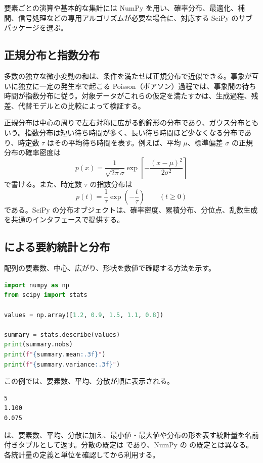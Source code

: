 要素ごとの演算や基本的な集計には NumPy を用い、確率分布、最適化、補間、信号処理などの専用アルゴリズムが必要な場合に、対応する SciPy のサブパッケージを選ぶ。

\subsection{正規分布と指数分布}

多数の独立な微小変動の和は、条件を満たせば正規分布で近似できる。事象が互いに独立に一定の発生率で起こる Poisson（ポアソン）過程では、事象間の待ち時間が指数分布に従う。対象データがこれらの仮定を満たすかは、生成過程、残差、代替モデルとの比較によって検証する。

正規分布は中心の周りで左右対称に広がる釣鐘形の分布であり、ガウス分布ともいう。指数分布は短い待ち時間が多く、長い待ち時間ほど少なくなる分布であり、時定数 \(\tau\) はその平均待ち時間を表す。例えば、平均 \(\mu\)、標準偏差 \(\sigma\) の正規分布の確率密度は
\[
p(x) = \frac{1}{\sqrt{2\pi}\sigma}
\exp\!\left[-\frac{(x-\mu)^2}{2\sigma^2}\right]
\]
で書ける。また、時定数 \(\tau\) の指数分布は
\[
p(t) = \frac{1}{\tau} \exp\!\left(-\frac{t}{\tau}\right)
\qquad (t \ge 0)
\]
である。SciPy の分布オブジェクトは、確率密度、累積分布、分位点、乱数生成を共通のインタフェースで提供する。

\subsection{ による要約統計と分布}

配列の要素数、中心、広がり、形状を数値で確認する方法を示す。

\begin{lstlisting}[language=Python]
import numpy as np
from scipy import stats

values = np.array([1.2, 0.9, 1.5, 1.1, 0.8])

summary = stats.describe(values)
print(summary.nobs)
print(f"{summary.mean:.3f}")
print(f"{summary.variance:.3f}")
\end{lstlisting}

この例では、要素数、平均、分散が順に表示される。

\begin{lstlisting}[numbers=none, xleftmargin=2\zw]
5
1.100
0.075
\end{lstlisting}

 は、要素数、平均、分散に加え、最小値・最大値や分布の形を表す統計量を名前付きタプルとして返す。分散の既定は  であり、NumPy の  の既定とは異なる。各統計量の定義と単位を確認してから利用する。

